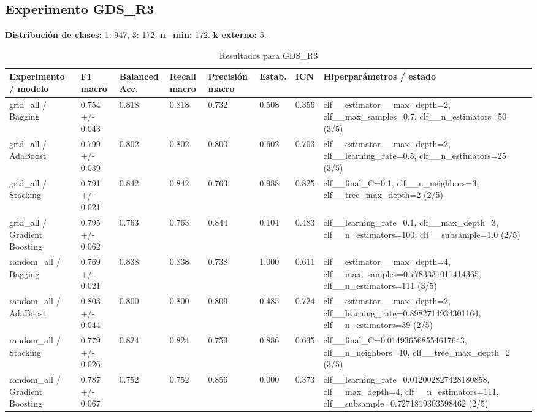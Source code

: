 \documentclass{article}
\begin{document}
\subsection*{Experimento GDS\_R3}
\noindent\textbf{Distribuci\'on de clases:} 1: 947, 3: 172. \textbf{n\_min:} 172. \textbf{k externo:} 5.
\begin{table}[h]
\centering
\caption{Resultados para GDS\_R3}
\scriptsize
\begin{tabular}{p{3.2cm}p{2.0cm}p{1.6cm}p{1.6cm}p{1.8cm}p{1.5cm}p{1.4cm}p{3.4cm}}
\toprule
Experimento / modelo & F1 macro & Balanced Acc. & Recall macro & Precisi\'on macro & Estab. & ICN & Hiperpar\'ametros / estado \\
\midrule
grid\_all / Bagging & 0.754 +/- 0.043 & 0.818 & 0.818 & 0.732 & 0.508 & 0.356 & clf\_\_estimator\_\_max\_depth=2, clf\_\_max\_samples=0.7, clf\_\_n\_estimators=50 (3/5) \\
grid\_all / AdaBoost & 0.799 +/- 0.039 & 0.802 & 0.802 & 0.800 & 0.602 & 0.703 & clf\_\_estimator\_\_max\_depth=2, clf\_\_learning\_rate=0.5, clf\_\_n\_estimators=25 (3/5) \\
grid\_all / Stacking & 0.791 +/- 0.021 & 0.842 & 0.842 & 0.763 & 0.988 & 0.825 & clf\_\_final\_C=0.1, clf\_\_n\_neighbors=3, clf\_\_tree\_max\_depth=2 (2/5) \\
grid\_all / Gradient Boosting & 0.795 +/- 0.062 & 0.763 & 0.763 & 0.844 & 0.104 & 0.483 & clf\_\_learning\_rate=0.1, clf\_\_max\_depth=3, clf\_\_n\_estimators=100, clf\_\_subsample=1.0 (2/5) \\
random\_all / Bagging & 0.769 +/- 0.021 & 0.838 & 0.838 & 0.738 & 1.000 & 0.611 & clf\_\_estimator\_\_max\_depth=4, clf\_\_max\_samples=0.7783331011414365, clf\_\_n\_estimators=111 (3/5) \\
random\_all / AdaBoost & 0.803 +/- 0.044 & 0.800 & 0.800 & 0.809 & 0.485 & 0.724 & clf\_\_estimator\_\_max\_depth=2, clf\_\_learning\_rate=0.8982714934301164, clf\_\_n\_estimators=39 (2/5) \\
random\_all / Stacking & 0.779 +/- 0.026 & 0.824 & 0.824 & 0.759 & 0.886 & 0.635 & clf\_\_final\_C=0.014936568554617643, clf\_\_n\_neighbors=10, clf\_\_tree\_max\_depth=2 (3/5) \\
random\_all / Gradient Boosting & 0.787 +/- 0.067 & 0.752 & 0.752 & 0.856 & 0.000 & 0.373 & clf\_\_learning\_rate=0.012002827428180858, clf\_\_max\_depth=4, clf\_\_n\_estimators=111, clf\_\_subsample=0.7271819303598462 (2/5) \\
\bottomrule
\end{tabular}
\end{table}
\end{document}
